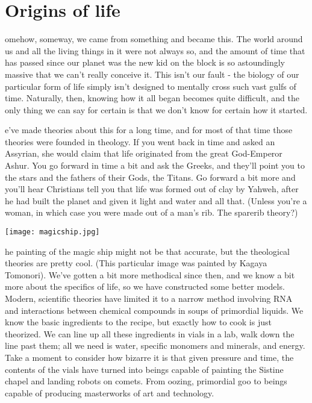 \section*{Origins of life}

omehow, someway, we came from something and became this. The world around us and all the living things in it were not always so, and the amount of time that has passed since our planet was the new kid on the block is so astoundingly massive that we can’t really conceive it. This isn’t our fault - the biology of our particular form of life simply isn’t designed to mentally cross such vast gulfs of time. Naturally, then, knowing how it all began becomes quite difficult, and the only thing we can say for certain is that we don’t know for certain how it started.

e’ve made theories about this for a long time, and for most of that time those theories were founded in theology. If you went back in time and asked an Assyrian, she would claim that life originated from the great God-Emperor Ashur. You go forward in time a bit and ask the Greeks, and they’ll point you to the stars and the fathers of their Gods, the Titans. Go forward a bit more and you’ll hear Christians tell you that life was formed out of clay by Yahweh, after he had built the planet and given it light and water and all that. (Unless you’re a woman, in which case you were made out of a man’s rib. The sparerib theory?) 

\begin{center}
	\texttt{[image: magicship.jpg]}
\end{center}

he painting of the magic ship might not be that accurate, but the theological theories are pretty cool. (This particular image was painted by Kagaya Tomonori). We’ve gotten a bit more methodical since then, and we know a bit more about the specifics of life, so we have constructed some better models. Modern, scientific theories have limited it to a narrow method involving RNA and interactions between chemical compounds in soups of primordial liquids. We know the basic ingredients to the recipe, but exactly how to cook is just theorized. We can line up all these ingredients in vials in a lab, walk down the line past them; all we need is water, specific monomers and minerals, and energy. Take a moment to consider how bizarre it is that given pressure and time, the contents of the vials have turned into beings capable of painting the Sistine chapel and landing robots on comets. From oozing, primordial goo to beings capable of producing masterworks of art and technology.

